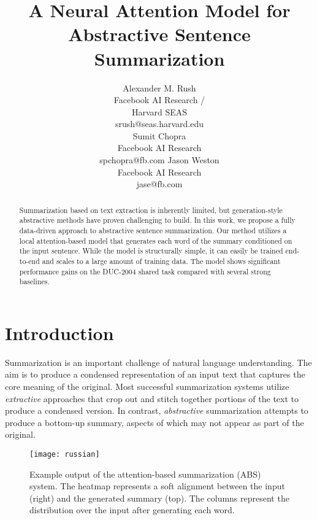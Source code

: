 \documentclass[11pt,a4paper]{article}
\title{A Neural Attention Model for
Abstractive Sentence Summarization}
\author{Alexander M. Rush \\
  Facebook AI Research / \\
  Harvard SEAS \\
  srush@seas.harvard.edu \\
  \And Sumit Chopra \\
  Facebook AI Research\\
  spchopra@fb.com
\And Jason Weston \\
Facebook AI Research\\
jase@fb.com}
\date{}
\begin{document}
\maketitle

\begin{abstract}
  Summarization based on text extraction is inherently limited, but
  generation-style abstractive methods have proven challenging to
  build. In this work, we propose a fully data-driven approach to
  abstractive sentence summarization. Our method utilizes a local
  attention-based model that generates each word of the summary
  conditioned on the input sentence. While
  the model is structurally simple, it can easily be trained
  end-to-end and scales to a large amount of training data. The model
  shows significant performance gains on the DUC-2004 shared task
  compared with several strong baselines.
\end{abstract}

\section{Introduction}

Summarization is an important challenge of natural language
understanding.  The aim is to produce a condensed representation of an
input text that captures the core meaning of the original. Most
successful summarization systems utilize \textit{extractive}
approaches that crop out and stitch together portions of
the text to produce a condensed version. In contrast,
\textit{abstractive} summarization attempts to produce a bottom-up summary, aspects of which may not appear as part of the
original.

\begin{figure}
  \centering
  \vspace*{-0.5cm}
  \texttt{[image: russian]}
  \caption{ \small \label{fig:aligna} Example output of the attention-based summarization (ABS) system. The heatmap represents a soft alignment between the input (right) and the generated summary (top). The columns represent the distribution over the input after generating each word.}
\end{figure}
\end{document}
